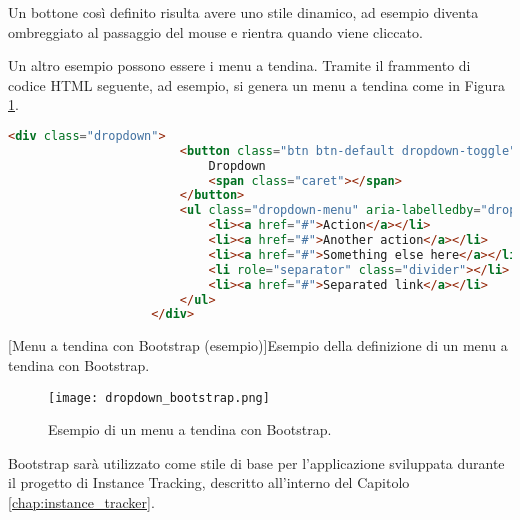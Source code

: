         	Un bottone così definito risulta avere uno stile dinamico, ad esempio diventa ombreggiato al passaggio del mouse e rientra quando viene cliccato.
        	
        	Un altro esempio possono essere i menu a tendina. Tramite il frammento di codice \ac{HTML} seguente, ad esempio, si genera un menu a tendina come in Figura \ref{fig:dropdown_bootstrap}.
        	
        	
            \begin{center}
                \begin{lstlisting}[language=html, gobble=18]
                    <div class="dropdown">
                        <button class="btn btn-default dropdown-toggle" type="button" id="dropdownMenu1" data-toggle="dropdown" aria-haspopup="true" aria-expanded="true">
                            Dropdown
                            <span class="caret"></span>
                        </button>
                        <ul class="dropdown-menu" aria-labelledby="dropdownMenu1">
                            <li><a href="#">Action</a></li>
                            <li><a href="#">Another action</a></li>
                            <li><a href="#">Something else here</a></li>
                            <li role="separator" class="divider"></li>
                            <li><a href="#">Separated link</a></li>
                        </ul>
                    </div>
                \end{lstlisting}
                \captionsetup{textformat=empty,labelformat=empty} \vspace{-2em}
                [Menu a tendina con Bootstrap (esempio)]{Esempio della definizione di un menu a tendina con Bootstrap.}
            \end{center}
            
        	\begin{figure}[h!]
        		\begin{center}
        			\texttt{[image: dropdown\_bootstrap.png]}
        		\end{center}
        		\caption[Menu a tendina con Bootstrap (esempio)]{Esempio di un menu a tendina con Bootstrap.}
        		\label{fig:dropdown_bootstrap}
        	\end{figure}
        	
        	Bootstrap sarà utilizzato come stile di base per l'applicazione sviluppata durante il progetto di Instance Tracking, descritto all'interno del Capitolo \ref{chap:instance_tracker}.
        
